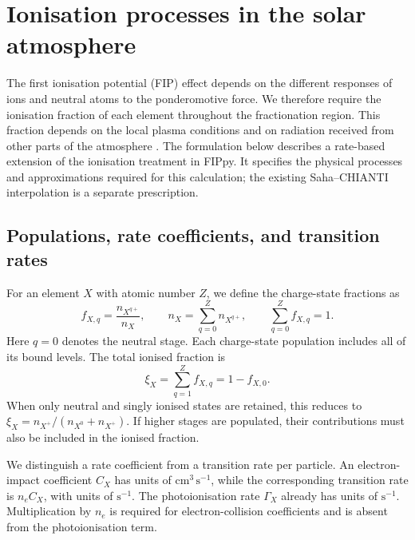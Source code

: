 \section{Ionisation processes in the solar atmosphere}
\label{sec:ionisation}

The first ionisation potential (FIP) effect depends on the different responses
of ions and neutral atoms to the ponderomotive force. We therefore require the
ionisation fraction of each element throughout the fractionation region.
This fraction depends on the local plasma conditions and on radiation received
from other parts of the atmosphere \citep{Laming2015}. The formulation below
describes a rate-based extension of the ionisation treatment in FIPpy.
It specifies the physical processes and approximations required for this
calculation; the existing Saha--CHIANTI interpolation is a separate prescription.

\subsection{Populations, rate coefficients, and transition rates}

For an element $X$ with atomic number $Z$, we define the charge-state fractions as
\begin{equation}
 f_{X,q} = \frac{n_{X^{q+}}}{n_X},
 \qquad n_X = \sum_{q=0}^{Z} n_{X^{q+}},
 \qquad \sum_{q=0}^{Z} f_{X,q}=1.
 \label{eq:ion-fractions}
\end{equation}
Here $q=0$ denotes the neutral stage. Each charge-state population includes
all of its bound levels. The total ionised fraction is
\begin{equation}
 \xi_X = \sum_{q=1}^{Z} f_{X,q} = 1-f_{X,0}.
 \label{eq:ion-total-fraction}
\end{equation}
When only neutral and singly ionised states are retained, this reduces to
$\xi_X=n_{X^+}/(n_{X^0}+n_{X^+})$. If higher stages are populated, their
contributions must also be included in the ionised fraction.

We distinguish a rate coefficient from a transition rate per particle.
An electron-impact coefficient $C_X$ has units of
$\mathrm{cm^3\,s^{-1}}$, while the corresponding transition rate is $n_e C_X$,
with units of $\mathrm{s^{-1}}$. The photoionisation rate $\Gamma_X$ already
has units of $\mathrm{s^{-1}}$. Multiplication by $n_e$ is required for
electron-collision coefficients and is absent from the photoionisation term.

